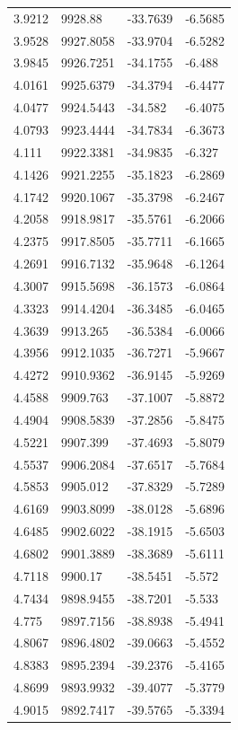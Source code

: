 \begin{table}[H]
\begin{tabular}{llll}
3.9212 & 9928.88 & -33.7639 & -6.5685 \\
3.9528 & 9927.8058 & -33.9704 & -6.5282 \\
3.9845 & 9926.7251 & -34.1755 & -6.488 \\
4.0161 & 9925.6379 & -34.3794 & -6.4477 \\
4.0477 & 9924.5443 & -34.582 & -6.4075 \\
4.0793 & 9923.4444 & -34.7834 & -6.3673 \\
4.111 & 9922.3381 & -34.9835 & -6.327 \\
4.1426 & 9921.2255 & -35.1823 & -6.2869 \\
4.1742 & 9920.1067 & -35.3798 & -6.2467 \\
4.2058 & 9918.9817 & -35.5761 & -6.2066 \\
4.2375 & 9917.8505 & -35.7711 & -6.1665 \\
4.2691 & 9916.7132 & -35.9648 & -6.1264 \\
4.3007 & 9915.5698 & -36.1573 & -6.0864 \\
4.3323 & 9914.4204 & -36.3485 & -6.0465 \\
4.3639 & 9913.265 & -36.5384 & -6.0066 \\
4.3956 & 9912.1035 & -36.7271 & -5.9667 \\
4.4272 & 9910.9362 & -36.9145 & -5.9269 \\
4.4588 & 9909.763 & -37.1007 & -5.8872 \\
4.4904 & 9908.5839 & -37.2856 & -5.8475 \\
4.5221 & 9907.399 & -37.4693 & -5.8079 \\
4.5537 & 9906.2084 & -37.6517 & -5.7684 \\
4.5853 & 9905.012 & -37.8329 & -5.7289 \\
4.6169 & 9903.8099 & -38.0128 & -5.6896 \\
4.6485 & 9902.6022 & -38.1915 & -5.6503 \\
4.6802 & 9901.3889 & -38.3689 & -5.6111 \\
4.7118 & 9900.17 & -38.5451 & -5.572 \\
4.7434 & 9898.9455 & -38.7201 & -5.533 \\
4.775 & 9897.7156 & -38.8938 & -5.4941 \\
4.8067 & 9896.4802 & -39.0663 & -5.4552 \\
4.8383 & 9895.2394 & -39.2376 & -5.4165 \\
4.8699 & 9893.9932 & -39.4077 & -5.3779 \\
4.9015 & 9892.7417 & -39.5765 & -5.3394 \\

\end{tabular}
\end{table}
